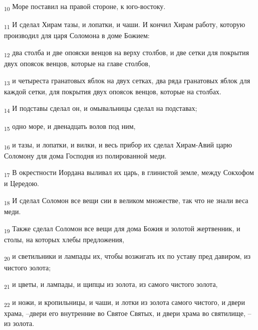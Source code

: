 \begin{tcolorbox}
\textsubscript{10} Море поставил на правой стороне, к юго-востоку.
\end{tcolorbox}
\begin{tcolorbox}
\textsubscript{11} И сделал Хирам тазы, и лопатки, и чаши. И кончил Хирам работу, которую производил для царя Соломона в доме Божием:
\end{tcolorbox}
\begin{tcolorbox}
\textsubscript{12} два столба и две опояски венцов на верху столбов, и две сетки для покрытия двух опоясок венцов, которые на главе столбов,
\end{tcolorbox}
\begin{tcolorbox}
\textsubscript{13} и четыреста гранатовых яблок на двух сетках, два ряда гранатовых яблок для каждой сетки, для покрытия двух опоясок венцов, которые на столбах.
\end{tcolorbox}
\begin{tcolorbox}
\textsubscript{14} И подставы сделал он, и омывальницы сделал на подставах;
\end{tcolorbox}
\begin{tcolorbox}
\textsubscript{15} одно море, и двенадцать волов под ним,
\end{tcolorbox}
\begin{tcolorbox}
\textsubscript{16} и тазы, и лопатки, и вилки, и весь прибор их сделал Хирам-Авий царю Соломону для дома Господня из полированной меди.
\end{tcolorbox}
\begin{tcolorbox}
\textsubscript{17} В окрестности Иордана выливал их царь, в глинистой земле, между Сокхофом и Цередою.
\end{tcolorbox}
\begin{tcolorbox}
\textsubscript{18} И сделал Соломон все вещи сии в великом множестве, так что не знали веса меди.
\end{tcolorbox}
\begin{tcolorbox}
\textsubscript{19} Также сделал Соломон все вещи для дома Божия и золотой жертвенник, и столы, на которых хлебы предложения,
\end{tcolorbox}
\begin{tcolorbox}
\textsubscript{20} и светильники и лампады их, чтобы возжигать их по уставу пред давиром, из чистого золота;
\end{tcolorbox}
\begin{tcolorbox}
\textsubscript{21} и цветы, и лампады, и щипцы из золота, из самого чистого золота,
\end{tcolorbox}
\begin{tcolorbox}
\textsubscript{22} и ножи, и кропильницы, и чаши, и лотки из золота самого чистого, и двери храма, --двери его внутренние во Святое Святых, и двери храма во святилище, --из золота.
\end{tcolorbox}
